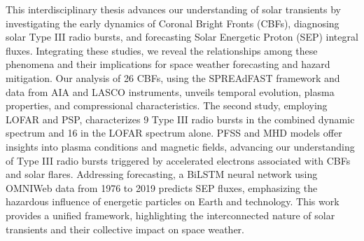 This interdisciplinary thesis advances our understanding of solar transients by investigating the early dynamics of Coronal Bright Fronts (CBFs), diagnosing solar Type III radio bursts, and forecasting Solar Energetic Proton (SEP) integral fluxes. Integrating these studies, we reveal the relationships among these phenomena and their implications for space weather forecasting and hazard mitigation. Our analysis of 26 CBFs, using the SPREAdFAST framework and data from AIA and LASCO instruments, unveils temporal evolution, plasma properties, and compressional characteristics. The second study, employing LOFAR and PSP, characterizes 9 Type III radio bursts in the combined dynamic spectrum and 16 in the LOFAR spectrum alone. PFSS and MHD models offer insights into plasma conditions and magnetic fields, advancing our understanding of Type III radio bursts triggered by accelerated electrons associated with CBFs and solar flares. Addressing forecasting, a BiLSTM neural network using OMNIWeb data from 1976 to 2019 predicts SEP fluxes, emphasizing the hazardous influence of energetic particles on Earth and technology. This work provides a unified framework, highlighting the interconnected nature of solar transients and their collective impact on space weather.
